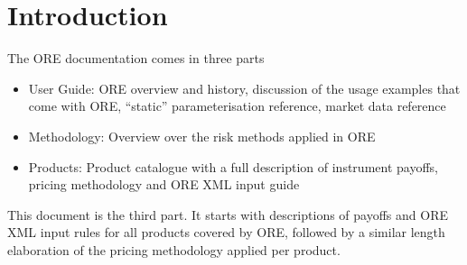 \documentclass[12pt, a4paper]{article}
\begin{document}
\newpage

\section{Introduction}

The ORE documentation comes in three parts
\begin{itemize}
\item User Guide: ORE overview and history, discussion of the usage examples that come with ORE, ``static'' parameterisation reference, market data reference  
\item Methodology: Overview over the risk methods applied in ORE
\item Products: Product catalogue with a full description of instrument payoffs, pricing methodology and ORE XML input guide
\end{itemize}

This document is the third part. It starts with descriptions of payoffs and ORE XML input rules for all products covered by ORE,
followed by a similar length elaboration of the pricing methodology applied per product.






 



































\end{document}
